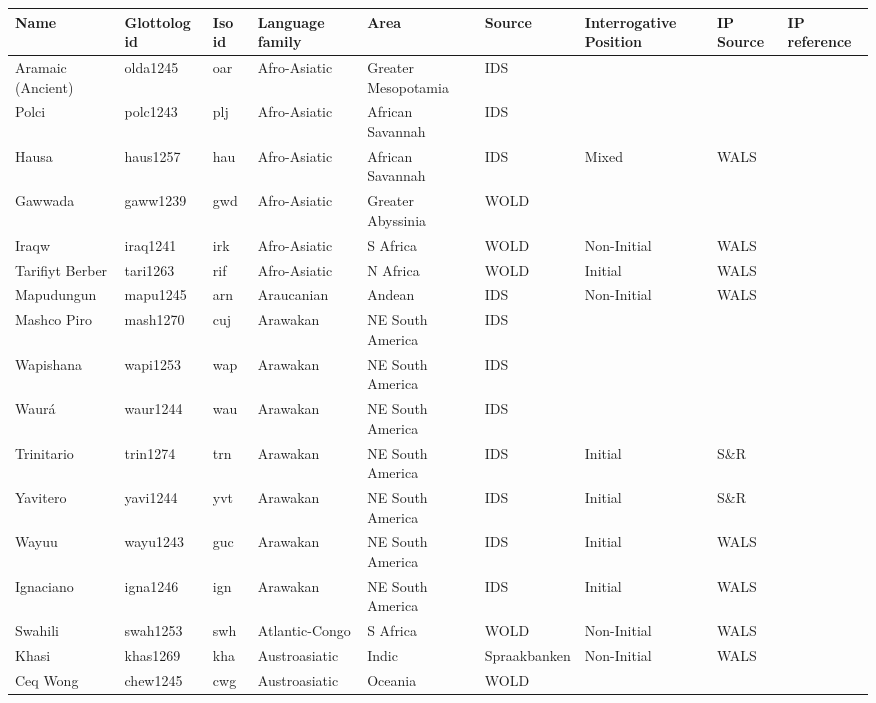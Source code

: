 \centering
\begin{longtable}{lllllllll}
  \hline
Name & Glottolog id & Iso id & Language family & Area & Source & Interrogative Position & IP Source & IP reference \\ 
  \hline
Aramaic (Ancient) & olda1245 & oar & Afro-Asiatic & Greater Mesopotamia & IDS &  &  &  \\ 
  Polci & polc1243 & plj & Afro-Asiatic & African Savannah & IDS &  &  &  \\ 
  Hausa & haus1257 & hau & Afro-Asiatic & African Savannah & IDS & Mixed & WALS &  \\ 
  Gawwada & gaww1239 & gwd & Afro-Asiatic & Greater Abyssinia & WOLD &  &  &  \\ 
  Iraqw & iraq1241 & irk & Afro-Asiatic & S Africa & WOLD & Non-Initial & WALS &  \\ 
  Tarifiyt Berber & tari1263 & rif & Afro-Asiatic & N Africa & WOLD & Initial & WALS &  \\ 
  Mapudungun & mapu1245 & arn & Araucanian & Andean & IDS & Non-Initial & WALS &  \\ 
  Mashco Piro & mash1270 & cuj & Arawakan & NE South America & IDS &  &  &  \\ 
  Wapishana & wapi1253 & wap & Arawakan & NE South America & IDS &  &  &  \\ 
  Waurá & waur1244 & wau & Arawakan & NE South America & IDS &  &  &  \\ 
  Trinitario & trin1274 & trn & Arawakan & NE South America & IDS & Initial & S\&R & \cite[91]{rose_trinitario2014.pdf} \\ 
  Yavitero & yavi1244 & yvt & Arawakan & NE South America & IDS & Initial & S\&R & \cite[638]{mosonyietal_yavitero2000.pdf}\cite[79...]{mosonyi_yavitero1987.pdf} \\ 
  Wayuu & wayu1243 & guc & Arawakan & NE South America & IDS & Initial & WALS &  \\ 
  Ignaciano & igna1246 & ign & Arawakan & NE South America & IDS & Initial & WALS &  \\ 
  Swahili & swah1253 & swh & Atlantic-Congo & S Africa & WOLD & Non-Initial & WALS &  \\ 
  Khasi & khas1269 & kha & Austroasiatic & Indic & Spraakbanken & Non-Initial & WALS &  \\ 
  Ceq Wong & chew1245 & cwg & Austroasiatic & Oceania & WOLD &  &  &  \\ 

\end{longtable}
